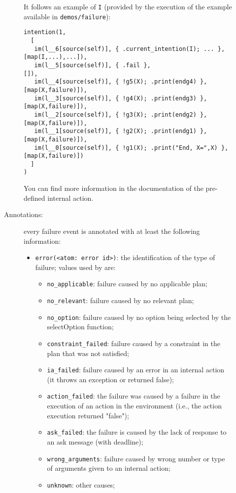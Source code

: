 \documentclass{article}
\begin{document}
\begin{description}
\begin{description}
  It follows an example of \texttt{I} (provided by the execution of the
  example available in \texttt{demos/failure}):
\begin{verbatim}
intention(1,
  [
   im(l__6[source(self)], { .current_intention(I); ... },  [map(I,...),...]),
   im(l__5[source(self)], { .fail },                       []),
   im(l__4[source(self)], { !g5(X); .print(endg4) },       [map(X,failure)]),
   im(l__3[source(self)], { !g4(X); .print(endg3) },       [map(X,failure)]),
   im(l__2[source(self)], { !g3(X); .print(endg2) },       [map(X,failure)]),
   im(l__1[source(self)], { !g2(X); .print(endg1) },       [map(X,failure)]),
   im(l__0[source(self)], { !g1(X); .print("End, X=",X) }, [map(X,failure)])
  ]
)
\end{verbatim}

  You can find more information in the documentation of the
  pre-defined internal action.


\item[Annotations:] every failure event is annotated with at least the
  following information:
  \begin{itemize}
  \item \texttt{error(<atom: error id>)}: the identification of the type of
    failure; values used by \Jason are:
    \begin{itemize}
    \item \texttt{no\_applicable}: failure caused by no applicable plan;
    \item \texttt{no\_relevant}: failure caused by no relevant plan;
    \item \texttt{no\_option}: failure caused by no option being selected by
      the selectOption function;
    \item \texttt{constraint\_failed}: failure caused by a constraint in the
      plan that was not satisfied;
    \item \texttt{ia\_failed}: failure caused by an error in an internal
      action (it throws an exception or returned false);
    \item \texttt{action\_failed}: the failure was caused by a failure
      in the execution of an action in the environment (i.e., the
      action execution returned "false");
    \item \texttt{ask\_failed}: the failure is caused by the lack of response
      to an ask message (with deadline);
    \item \texttt{wrong\_arguments}: failure caused by wrong number or
      type of arguments given to an internal action;
    \item \texttt{unknown}: other causes;
    \end{itemize}


\end{itemize}
\end{description}
\end{description}
\end{document}
